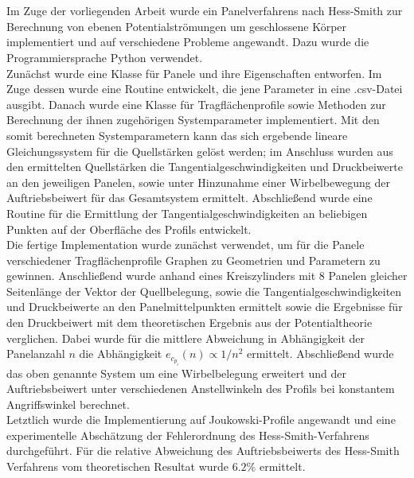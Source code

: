 \chapter*{\abstractname} %
Im Zuge der vorliegenden Arbeit wurde ein Panelverfahrens nach Hess-Smith zur Berechnung von ebenen Potentialströmungen um geschlossene Körper implementiert und auf verschiedene Probleme angewandt. Dazu wurde die Programmiersprache Python verwendet.
\\
Zunächst wurde eine Klasse für Panele und ihre Eigenschaften entworfen. Im Zuge dessen wurde eine Routine entwickelt, die jene Parameter in eine .csv-Datei ausgibt. Danach wurde eine Klasse für Tragflächenprofile sowie Methoden zur Berechnung der ihnen zugehörigen Systemparameter implementiert. Mit den somit berechneten Systemparametern kann das sich ergebende lineare Gleichungssystem für die Quellstärken gelöst werden; im Anschluss wurden aus den ermittelten Quellstärken die Tangentialgeschwindigkeiten und Druckbeiwerte an den jeweiligen Panelen, sowie unter Hinzunahme einer Wirbelbewegung der Auftriebsbeiwert für das Gesamtsystem ermittelt. Abschließend wurde eine Routine für die Ermittlung der Tangentialgeschwindigkeiten an beliebigen Punkten auf der Oberfläche des Profils entwickelt.
\\
Die fertige Implementation wurde zunächst verwendet, um für die Panele verschiedener Tragflächenprofile Graphen zu Geometrien und Parametern zu gewinnen. Anschließend wurde anhand eines Kreiszylinders mit 8 Panelen gleicher Seitenlänge der Vektor der Quellbelegung, sowie die Tangentialgeschwindigkeiten und Druckbeiwerte an den Panelmittelpunkten ermittelt sowie die Ergebnisse für den Druckbeiwert mit dem theoretischen Ergebnis aus der Potentialtheorie verglichen. Dabei wurde für die mittlere Abweichung in Abhängigkeit der Panelanzahl $n$ die Abhängigkeit $e_{c_{p_i}}(n) \propto 1 / n^2$ ermittelt. Abschließend wurde das oben genannte System um eine Wirbelbelegung erweitert und der Auftriebsbeiwert unter verschiedenen Anstellwinkeln des Profils bei konstantem Angriffswinkel berechnet. 
\\
Letztlich wurde die Implementierung auf Joukowski-Profile angewandt und eine experimentelle Abschätzung der Fehlerordnung des Hess-Smith-Verfahrens durchgeführt. Für die relative Abweichung des Auftriebsbeiwerts des Hess-Smith Verfahrens vom theoretischen Resultat wurde $6.2 \%$ ermittelt.

\newpage
